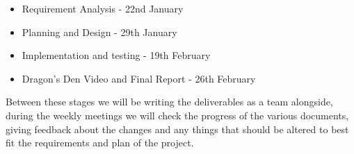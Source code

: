 \documentclass{article}
\begin{document}
\begin{itemize}
  \item Requirement Analysis
        - 22nd January
  \item Planning and Design
        - 29th January
  \item Implementation and testing
        - 19th February
  \item Dragon's Den Video and Final Report
        - 26th February
\end{itemize}

Between these stages we will be writing the deliverables as a team alongside,
during the weekly meetings we will check the progress of the various documents,
giving feedback about the changes and any things that should be altered to best 
fit the requirements and plan of the project.
\end{document}
